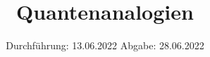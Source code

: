 

\subject{V23}
\title{Quantenanalogien}
\date{%
  Durchführung: 13.06.2022
  \hspace{3em}
  Abgabe: 28.06.2022
}



\maketitle
\thispagestyle{empty}
\tableofcontents
\newpage





\nocite{*}
\printbibliography{}


